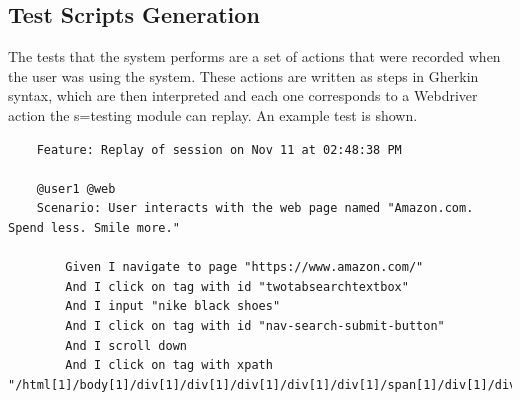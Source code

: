 
\subsection{Test Scripts Generation}

The tests that the system performs are a set of actions that were recorded when the user was using the system. These actions are written as steps in Gherkin syntax, which are then interpreted and each one corresponds to a Webdriver action the s=testing module can replay. An example test is shown.

\begin{lstlisting}
    Feature: Replay of session on Nov 11 at 02:48:38 PM

    @user1 @web
    Scenario: User interacts with the web page named "Amazon.com. Spend less. Smile more."
    
        Given I navigate to page "https://www.amazon.com/"
        And I click on tag with id "twotabsearchtextbox"
        And I input "nike black shoes"
        And I click on tag with id "nav-search-submit-button"
        And I scroll down
        And I click on tag with xpath "/html[1]/body[1]/div[1]/div[1]/div[1]/div[1]/div[1]/span[1]/div[1]/div[9]/div[1]/div[1]/span[1]/div[1]/div[1]/div[1]/span[1]/a[1]/div[1]"
\end{lstlisting}

